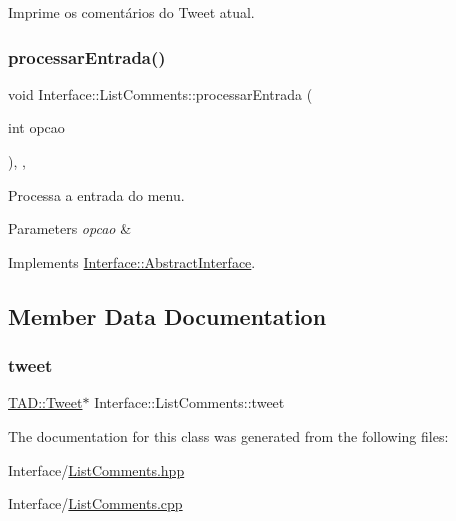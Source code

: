 Imprime os comentários do Tweet atual. 

\mbox{\label{class_interface_1_1_list_comments_a5b02d2e6a845fd356bfc7d4e418b9c3c}} 
\subsubsection{\texorpdfstring{processar\+Entrada()}{processarEntrada()}}
{\footnotesize\ttfamily void Interface\+::\+List\+Comments\+::processar\+Entrada (\begin{DoxyParamCaption}\item[{int}]{opcao }\end{DoxyParamCaption})\hspace{0.3cm}{\ttfamily [override]}, {\ttfamily [private]}, {\ttfamily [virtual]}}



Processa a entrada do menu. 


\begin{DoxyParams}{Parameters}
{\em opcao} & \\
\hline
\end{DoxyParams}


Implements \hyperlink{class_interface_1_1_abstract_interface_a9318f98f907ce54ef2dbf892ba327da2}{Interface\+::\+Abstract\+Interface}.



\subsection{Member Data Documentation}
\mbox{\label{class_interface_1_1_list_comments_a4d7e333288fc27c09172b7d98344d02c}} 
\subsubsection{\texorpdfstring{tweet}{tweet}}
{\footnotesize\ttfamily \hyperlink{class_t_a_d_1_1_tweet}{T\+A\+D\+::\+Tweet}$\ast$ Interface\+::\+List\+Comments\+::tweet\hspace{0.3cm}{\ttfamily [private]}}



The documentation for this class was generated from the following files\+:\begin{DoxyCompactItemize}
\item 
Interface/\hyperlink{_list_comments_8hpp}{List\+Comments.\+hpp}\item 
Interface/\hyperlink{_list_comments_8cpp}{List\+Comments.\+cpp}\end{DoxyCompactItemize}
